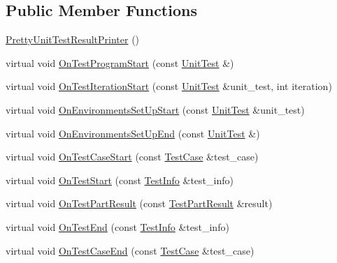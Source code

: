 \subsection*{Public Member Functions}
\begin{DoxyCompactItemize}
\item 
\hyperlink{classtesting_1_1internal_1_1PrettyUnitTestResultPrinter_a9219a4263ef0057c98a2a2a41f35ee15}{Pretty\+Unit\+Test\+Result\+Printer} ()
\item 
virtual void \hyperlink{classtesting_1_1internal_1_1PrettyUnitTestResultPrinter_a7a6b6de195b4ef3c9f2edd2e6c270f3e}{On\+Test\+Program\+Start} (const \hyperlink{classtesting_1_1UnitTest}{Unit\+Test} \&)
\item 
virtual void \hyperlink{classtesting_1_1internal_1_1PrettyUnitTestResultPrinter_abdba10a8c97e272ab4cee97cb652c957}{On\+Test\+Iteration\+Start} (const \hyperlink{classtesting_1_1UnitTest}{Unit\+Test} \&unit\+\_\+test, int iteration)
\item 
virtual void \hyperlink{classtesting_1_1internal_1_1PrettyUnitTestResultPrinter_a846a5e82b421e04fcdd2b1b2b64b162f}{On\+Environments\+Set\+Up\+Start} (const \hyperlink{classtesting_1_1UnitTest}{Unit\+Test} \&unit\+\_\+test)
\item 
virtual void \hyperlink{classtesting_1_1internal_1_1PrettyUnitTestResultPrinter_aadba892f02606a8b0c5f5982b3553aac}{On\+Environments\+Set\+Up\+End} (const \hyperlink{classtesting_1_1UnitTest}{Unit\+Test} \&)
\item 
virtual void \hyperlink{classtesting_1_1internal_1_1PrettyUnitTestResultPrinter_adcb68c729565d4bcdf8418a52902c3de}{On\+Test\+Case\+Start} (const \hyperlink{classtesting_1_1TestCase}{Test\+Case} \&test\+\_\+case)
\item 
virtual void \hyperlink{classtesting_1_1internal_1_1PrettyUnitTestResultPrinter_a5078ee71cfa97e37ae7a9366149195c5}{On\+Test\+Start} (const \hyperlink{classtesting_1_1TestInfo}{Test\+Info} \&test\+\_\+info)
\item 
virtual void \hyperlink{classtesting_1_1internal_1_1PrettyUnitTestResultPrinter_a7589e8df7485349498a3a81bf16e2f68}{On\+Test\+Part\+Result} (const \hyperlink{classtesting_1_1TestPartResult}{Test\+Part\+Result} \&result)
\item 
virtual void \hyperlink{classtesting_1_1internal_1_1PrettyUnitTestResultPrinter_a06749ff2b32a16c127374ecd015f13e0}{On\+Test\+End} (const \hyperlink{classtesting_1_1TestInfo}{Test\+Info} \&test\+\_\+info)
\item 
virtual void \hyperlink{classtesting_1_1internal_1_1PrettyUnitTestResultPrinter_a7a62fe58fa6f6aace813eb62b31e5a51}{On\+Test\+Case\+End} (const \hyperlink{classtesting_1_1TestCase}{Test\+Case} \&test\+\_\+case)

\end{DoxyCompactItemize}
